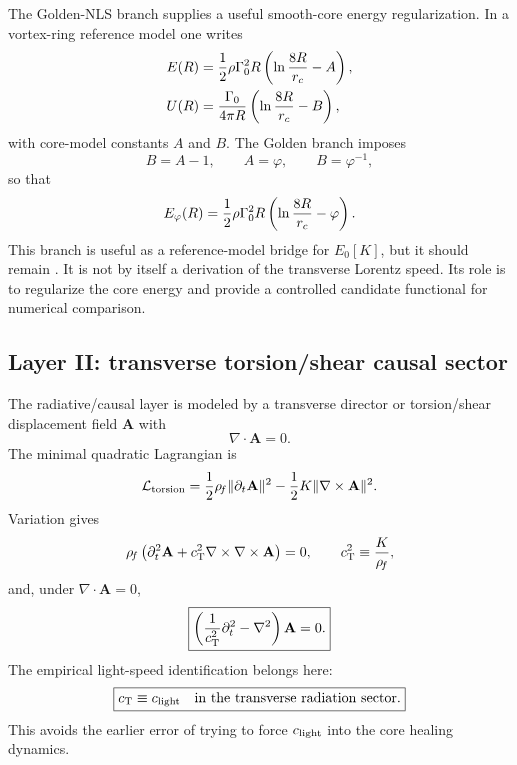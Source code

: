 The Golden-NLS branch supplies a useful smooth-core energy regularization.  In a vortex-ring reference model one writes
\begin{align}
    E(R)
    &=
    \frac12\rho\Gamma_0^2R
    \left(\ln\frac{8R}{r_c}-A\right),\\
    U(R)
    &=
    \frac{\Gamma_0}{4\pi R}
    \left(\ln\frac{8R}{r_c}-B\right),
\end{align}
with core-model constants \(A\) and \(B\).  The Golden branch imposes
\begin{equation}
    B=A-1,
    \qquad
    A=\varphi,
    \qquad
    B=\varphi^{-1},
    \label{eq:ctim-golden-branch}
\end{equation}
so that
\begin{equation}
    E_{\varphi}(R)
    =
    \frac12\rho\Gamma_0^2R
    \left(\ln\frac{8R}{r_c}-\varphi\right).
    \label{eq:ctim-golden-energy}
\end{equation}
This branch is useful as a reference-model bridge for \(E_0[K]\), but it should remain .  It is not by itself a derivation of the transverse Lorentz speed.  Its role is to regularize the core energy and provide a controlled candidate functional for numerical comparison.

\subsection{Layer II: transverse torsion/shear causal sector}
\label{subsec:ctim-torsion-layer}

The radiative/causal layer is modeled by a transverse director or torsion/shear displacement field \(\mathbf A\) with
\begin{equation}
    \nabla\cdot\mathbf A=0.
\end{equation}
The minimal quadratic Lagrangian is
\begin{equation}
    \mathcal L_{\mathrm{torsion}}
    =
    \frac12\rho_{\!f}\lVert\partial_t\mathbf A\rVert^2
    -
    \frac12K\lVert\nabla\times\mathbf A\rVert^2.
    \label{eq:ctim-torsion-lagrangian}
\end{equation}
Variation gives
\begin{equation}
    \rho_{\!f}\left(\partial_t^2\mathbf A+
    c_{\mathrm{T}}^2\nabla\times\nabla\times\mathbf A\right)=0,
    \qquad
    c_{\mathrm{T}}^2\equiv\frac{K}{\rho_{\!f}},
    \label{eq:ctim-torsion-wave-pre}
\end{equation}
and, under \(\nabla\cdot\mathbf A=0\),
\begin{equation}
    \boxed{
    \left(\frac{1}{c_{\mathrm{T}}^2}\partial_t^2-\nabla^2\right)\mathbf A=0.
    }
    \label{eq:ctim-torsion-wave}
\end{equation}
The empirical light-speed identification belongs here:
\begin{equation}
    \boxed{c_{\mathrm{T}}\equiv c_{\mathrm{light}}\quad\text{in the transverse radiation sector}.}
    \label{eq:ctim-c-identification}
\end{equation}
This avoids the earlier error of trying to force \(c_{\mathrm{light}}\) into the core healing dynamics.

